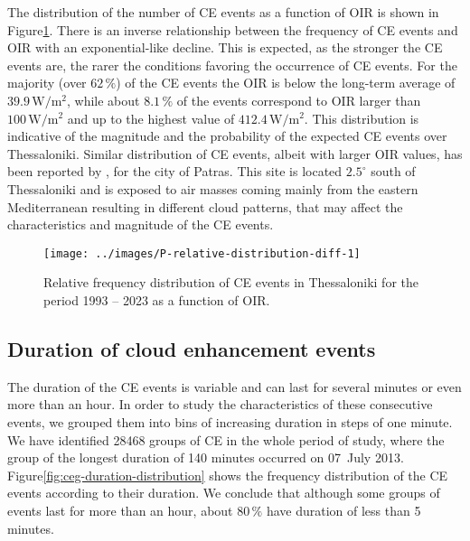 \documentclass[preprint, 5p,
authoryear]{elsarticle} %
\begin{document}
The distribution of the number of CE events as a function of OIR is
shown in Figure\nobreakspace{}\ref{fig:ovir-distribution}. There is an
inverse relationship between the frequency of CE events and OIR with an
exponential-like decline. This is expected, as the stronger the CE
events are, the rarer the conditions favoring the occurrence of CE
events. For the majority (over \(62\,\%\)) of the CE events the OIR is
below the long-term average of \(39.9\,\text{W}/\text{m}^2\), while
about \(8.1\,\%\) of the events correspond to OIR larger than
\(100\,\text{W}/\text{m}^2\) and up to the highest value of
\(412.4\,\text{W}/\text{m}^2\). This distribution is indicative of the
magnitude and the probability of the expected CE events over
Thessaloniki. Similar distribution of CE events, albeit with larger OIR
values, has been reported by \citet{Vamvakas2020}, for the city of
Patras. This site is located \(2.5^\circ\) south of Thessaloniki and is
exposed to air masses coming mainly from the eastern Mediterranean
resulting in different cloud patterns, that may affect the
characteristics and magnitude of the CE events.

\begin{figure}

{\centering \texttt{[image: ../images/P-relative-distribution-diff-1]} 

}

\caption{Relative frequency distribution of CE events in Thessaloniki for the period 1993 -- 2023 as a function of OIR.}\label{fig:ovir-distribution}
\end{figure}

\hypertarget{duration-of-cloud-enhancement-events}{%
\subsection{Duration of cloud enhancement
events}\label{duration-of-cloud-enhancement-events}}

The duration of the CE events is variable and can last for several
minutes or even more than an hour. In order to study the characteristics
of these consecutive events, we grouped them into bins of increasing
duration in steps of one minute. We have identified 28468 groups of CE
in the whole period of study, where the group of the longest duration of
140 minutes occurred on 07~July 2013.
Figure\nobreakspace{}\ref{fig:ceg-duration-distribution} shows the
frequency distribution of the CE events according to their duration. We
conclude that although some groups of events last for more than an hour,
about \(80\,\%\) have duration of less than 5 minutes.
\end{document}
